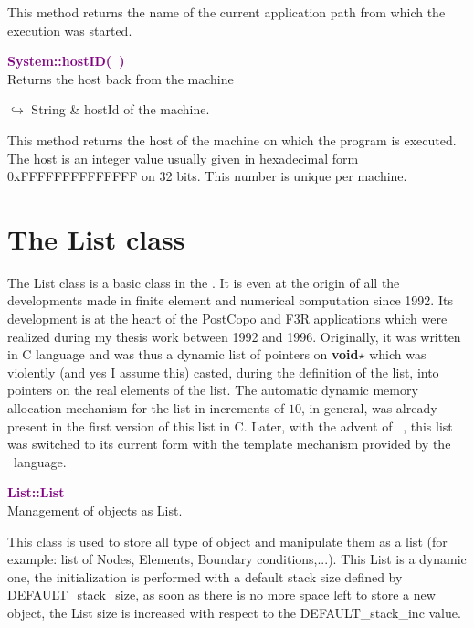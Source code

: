 This method returns the name of the current application path from which the execution was started.

\textcolor{purple}{\textbf{System::hostID(~)}}\label{System::hostID()}\\
Returns the host back from the machine\vspace*{-0.5em}
\begin{tcolorbox}[grow to left by=-1cm, width=\textwidth-1cm,myArgs,tabularx={l|R}]
$\hookrightarrow$ String & hostId of the machine.
\end{tcolorbox}

This method returns the host of the machine on which the program is executed. The host is an integer value usually given in hexadecimal form 0xFFFFFFFFFFFFFF on 32 bits. This number is unique per machine.

\section{The List class}

The List class is a basic class in the \DynELA. It is even at the origin of all the developments made in finite element and numerical computation since 1992. Its development is at the heart of the PostCopo and F3R applications which were realized during my thesis work between 1992 and 1996. Originally, it was written in C language and was thus a dynamic list of pointers on \textbf{void$\star$} which was violently (and yes I assume this) casted, during the definition of the list, into pointers on the real elements of the list. The automatic dynamic memory allocation mechanism for the list in increments of $10$, in general, was already present in the first version of this list in C. Later, with the advent of \Cpp~, this list was switched to its current form with the template mechanism provided by the \Cpp~language.

\textcolor{purple}{\textbf{List::List}}\label{List::List}\\
Management of objects as List.

This class is used to store all type of object and manipulate them as a list (for example: list of Nodes, Elements, Boundary conditions,...).
This List is a dynamic one, the initialization is performed with a default stack size defined by DEFAULT\_stack\_size, as soon as there is no more space left to store a new object,
the List size is increased with respect to the DEFAULT\_stack\_inc value.




